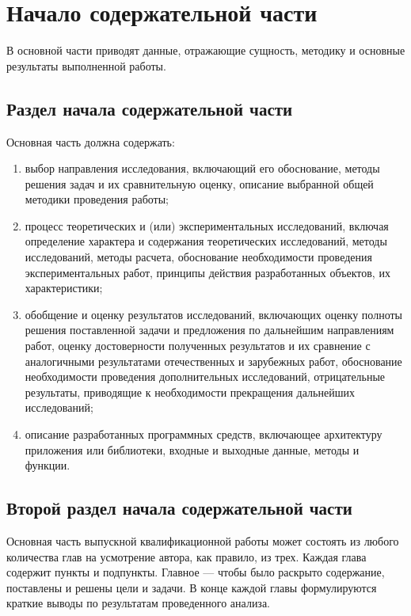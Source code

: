 \chapter{Начало содержательной части}

В основной части приводят данные, отражающие сущность, методику и основные результаты выполненной работы.

\section{Раздел начала содержательной части}

Основная часть должна содержать:
\begin{enumerate}
	\item выбор направления исследования, включающий его обоснование, методы решения задач и их сравнительную оценку, описание выбранной общей методики проведения работы;
	\item процесс теоретических и (или) экспериментальных исследований, включая определение характера и содержания теоретических исследований, методы исследований, методы расчета, обоснование необходимости проведения экспериментальных работ, принципы действия разработанных объектов, их характеристики;
	\item обобщение и оценку результатов исследований, включающих оценку полноты решения поставленной задачи и предложения по дальнейшим направлениям работ, оценку достоверности полученных результатов и их сравнение с аналогичными результатами отечественных и зарубежных работ, обоснование необходимости проведения дополнительных исследований, отрицательные результаты, приводящие к необходимости прекращения дальнейших исследований;
	\item описание разработанных программных средств, включающее архитектуру приложения или библиотеки, входные и выходные данные, методы и функции.
\end{enumerate}

\section{Второй раздел начала содержательной части}

Основная часть выпускной квалификационной работы может состоять из любого количества глав на усмотрение автора, как правило, из трех. Каждая глава содержит пункты и подпункты. Главное --- чтобы было раскрыто содержание, поставлены и решены цели и задачи. В конце каждой главы формулируются краткие выводы по результатам проведенного анализа.

